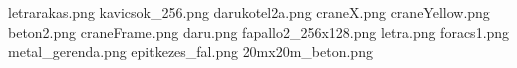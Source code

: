 letrarakas.png
kavicsok_256.png
darukotel2a.png
craneX.png
craneYellow.png
beton2.png
craneFrame.png
daru.png
fapallo2_256x128.png
letra.png
foracs1.png
metal_gerenda.png
epitkezes_fal.png
20mx20m_beton.png
